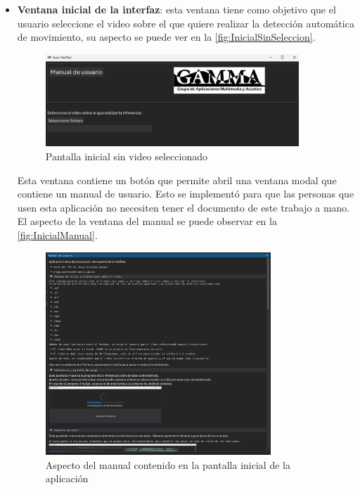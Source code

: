 \begin{itemize}
    \item \textbf{Ventana inicial de la interfaz}: esta ventana tiene como objetivo que el usuario seleccione el video sobre el que quiere realizar la detección automática de movimiento, su aspecto se puede ver en la 
    \autoref{fig:InicialSinSeleccion}.
    \begin{figure}[H]
        \centering
        \includegraphics[width=0.9\textwidth]{images/6/6.5/VentanaInicial.png}
        \caption{Pantalla inicial sin video seleccionado}
        \label{fig:InicialSinSeleccion}
    \end{figure}

    Esta ventana contiene un botón que permite abril una ventana modal que contiene un manual de usuario. Esto se implementó para que las personas que usen esta aplicación no necesiten tener el documento de este trabajo a mano. 
    El aspecto de la ventana del manual se puede observar en la \autoref{fig:InicialManual}.

    \begin{figure}[H]
        \centering
        \includegraphics[width=0.8\textwidth]{images/6/6.5/Manual.png}
        \caption{Aspecto del manual contenido en la pantalla inicial de la aplicación}
        \label{fig:InicialManual}
    \end{figure}


\end{itemize}
